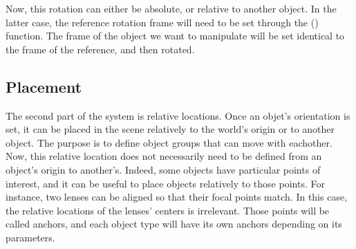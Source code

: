  Now, this rotation can either be absolute, or relative to another object. In the latter case, the reference rotation frame will need to be set through the () function. The frame of the object we want to manipulate will be set identical to the frame of the reference, and then rotated.

\subsection{Placement}

The second part of the system is relative locations. Once an objet's orientation is set, it can be placed in the scene relatively to the world's origin or to another object. The purpose is to define object groups that can move with eachother. Now, this relative location does not necessarily need to be defined from an object's origin to another's. Indeed, some objects have particular points of interest, and it can be useful to place objects relatively to those points. For instance, two lenses can be aligned so that their focal points match. In this case, the relative locations of the lenses' centers is irrelevant. Those points will be called anchors, and each object type will have its own anchors depending on its parameters.

